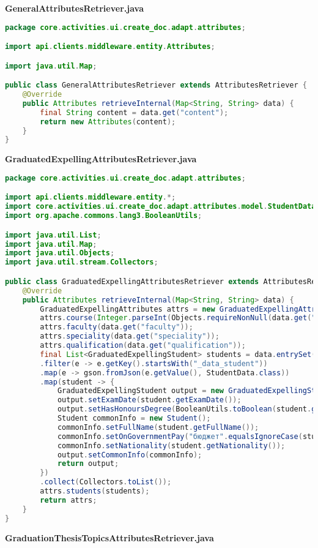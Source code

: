 \textbf{GeneralAttributesRetriever.java}
\begin{lstlisting}[language=Java]
package core.activities.ui.create_doc.adapt.attributes;

import api.clients.middleware.entity.Attributes;

import java.util.Map;

public class GeneralAttributesRetriever extends AttributesRetriever {
	@Override
	public Attributes retrieveInternal(Map<String, String> data) {
		final String content = data.get("content");
		return new Attributes(content);
	}
}

\end{lstlisting}
\textbf{GraduatedExpellingAttributesRetriever.java}
\begin{lstlisting}[language=Java]
package core.activities.ui.create_doc.adapt.attributes;

import api.clients.middleware.entity.*;
import core.activities.ui.create_doc.adapt.attributes.model.StudentData;
import org.apache.commons.lang3.BooleanUtils;

import java.util.List;
import java.util.Map;
import java.util.Objects;
import java.util.stream.Collectors;

public class GraduatedExpellingAttributesRetriever extends AttributesRetriever {
	@Override
	public Attributes retrieveInternal(Map<String, String> data) {
		GraduatedExpellingAttributes attrs = new GraduatedExpellingAttributes();
		attrs.course(Integer.parseInt(Objects.requireNonNull(data.get("course"))));
		attrs.faculty(data.get("faculty"));
		attrs.speciality(data.get("speciality"));
		attrs.qualification(data.get("qualification"));
		final List<GraduatedExpellingStudent> students = data.entrySet().stream()
		.filter(e -> e.getKey().startsWith("_data_student"))
		.map(e -> gson.fromJson(e.getValue(), StudentData.class))
		.map(student -> {
			GraduatedExpellingStudent output = new GraduatedExpellingStudent();
			output.setExamDate(student.getExamDate());
			output.setHasHonoursDegree(BooleanUtils.toBoolean(student.getHonoursDegree()));
			Student commonInfo = new Student();
			commonInfo.setFullName(student.getFullName());
			commonInfo.setOnGovernmentPay("бюджет".equalsIgnoreCase(student.getOnGovernmentPay()));
			commonInfo.setNationality(student.getNationality());
			output.setCommonInfo(commonInfo);
			return output;
		})
		.collect(Collectors.toList());
		attrs.students(students);
		return attrs;
	}
}

\end{lstlisting}
\textbf{GraduationThesisTopicsAttributesRetriever.java}
